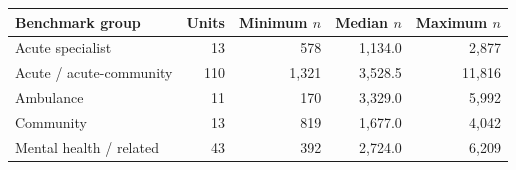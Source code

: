 \begin{tabular}{lrrrr}
\toprule
Benchmark group & Units & Minimum $n$ & Median $n$ & Maximum $n$ \\
\midrule
Acute specialist & 13 & 578 & 1,134.0 & 2,877 \\
Acute / acute-community & 110 & 1,321 & 3,528.5 & 11,816 \\
Ambulance & 11 & 170 & 3,329.0 & 5,992 \\
Community & 13 & 819 & 1,677.0 & 4,042 \\
Mental health / related & 43 & 392 & 2,724.0 & 6,209 \\
\bottomrule
\end{tabular}
